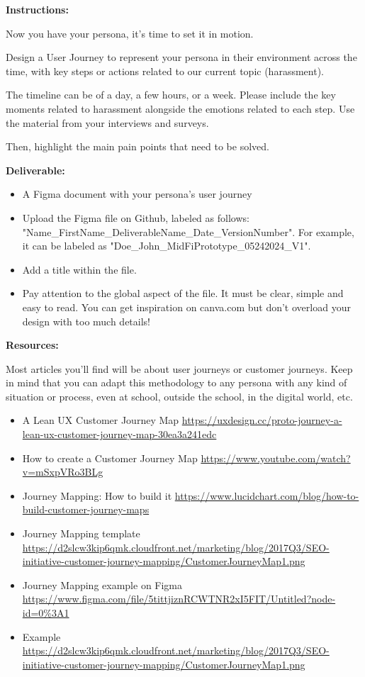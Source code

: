 \makeheaderfiles

\textbf{Instructions:}

Now you have your persona, it's time to set it in motion.

Design a User Journey to represent your persona in their environment across the time, with key steps or actions related to our current topic (harassment).

The timeline can be of a day, a few hours, or a week. Please include the key moments related to harassment alongside the emotions related to each step. Use the material from your interviews and surveys.

Then, highlight the main pain points that need to be solved.

\textbf{Deliverable:}

\begin{itemize}
\item A Figma document with your persona's user journey
\item Upload the Figma file on Github, labeled as follows: "Name\_FirstName\_DeliverableName\_Date\_VersionNumber". For example, it can be labeled as "Doe\_John\_MidFiPrototype\_05242024\_V1".
\item Add a title within the file.
\item Pay attention to the global aspect of the file. It must be clear, simple and easy to read. You can get inspiration on canva.com but don't overload your design with too much details!
\end{itemize}

\textbf{Resources:}

Most articles you'll find will be about user journeys or customer journeys. Keep in mind that you can adapt this methodology to any persona with any kind of situation or process, even at school, outside the school, in the digital world, etc.

\begin{itemize}
\item A Lean UX Customer Journey Map \url{https://uxdesign.cc/proto-journey-a-lean-ux-customer-journey-map-30ea3a241edc}
\item How to create a Customer Journey Map \url{https://www.youtube.com/watch?v=mSxpVRo3BLg}
\item Journey Mapping: How to build it \url{https://www.lucidchart.com/blog/how-to-build-customer-journey-maps}
\item Journey Mapping template \url{https://d2slcw3kip6qmk.cloudfront.net/marketing/blog/2017Q3/SEO-initiative-customer-journey-mapping/CustomerJourneyMap1.png}
\item Journey Mapping example on Figma \url{https://www.figma.com/file/5tittjiznRCWTNR2xI5FIT/Untitled?node-id=0%3A1}
\item Example \url{https://d2slcw3kip6qmk.cloudfront.net/marketing/blog/2017Q3/SEO-initiative-customer-journey-mapping/CustomerJourneyMap1.png}
\end{itemize}

